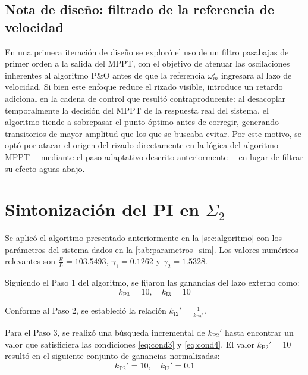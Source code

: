 \subsection{Nota de diseño: filtrado de la referencia de velocidad}

En una primera iteración de diseño se exploró el uso de un filtro
pasabajas de primer orden a la salida del MPPT, con el objetivo de atenuar
las oscilaciones inherentes al algoritmo P\&O antes de que la referencia
$\omega_m^\star$ ingresara al lazo de velocidad. Si bien este enfoque
reduce el rizado visible, introduce un retardo adicional en la cadena de
control que resultó contraproducente: al desacoplar temporalmente la
decisión del MPPT de la respuesta real del sistema, el algoritmo tiende a
sobrepasar el punto óptimo antes de corregir, generando transitorios de
mayor amplitud que los que se buscaba evitar. Por este motivo, se optó por
atacar el origen del rizado directamente en la lógica del algoritmo MPPT
—mediante el paso adaptativo descrito anteriormente— en lugar de filtrar
su efecto aguas abajo.

\section{Sintonización del PI en \texorpdfstring{$\Sigma_2$}{Sigma 2}}

Se aplicó el algoritmo presentado anteriormente en la \autoref{sec:algoritmo}
con los parámetros del sistema dados en la \autoref{tab:parametros_sim}. Los valores 
numéricos relevantes son $\frac{R}{L} = 103.5493$, 
$\bar{\gamma}_1 = 0.1262$ y $\bar{\gamma}_2 = 1.5328$.

Siguiendo el Paso 1 del algoritmo, se fijaron las ganancias del lazo externo como:
\begin{equation}
    k_{\textrm{P3}} = 10, \quad k_{\textrm{I3}} = 10
\end{equation}

Conforme al Paso 2, se estableció la relación $k_{\textrm{I2}}' = \frac{1}{k_{\textrm{P2}}'}$.

Para el Paso 3, se realizó una búsqueda incremental de $k_{\textrm{P2}}'$ hasta encontrar 
un valor que satisficiera las condiciones \eqref{eq:cond3} y \eqref{eq:cond4}. El valor 
$k_{\textrm{P2}}' = 10$ resultó en el siguiente conjunto de ganancias normalizadas:
\begin{equation}
    k_{\textrm{P2}}' = 10, \quad k_{\textrm{I2}}' = 0.1
\end{equation}

